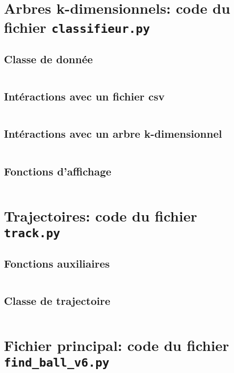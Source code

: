 \documentclass[12pt,a4paper,fleqn]{article}
\begin{document}
\newpage
\section{Arbres k-dimensionnels: code du fichier \texttt{classifieur.py}}

\subsection{Classe de donnée}
\inputminted[firstline=1,lastline=36]{python}{../classifieur.py}
\subsection{Intéractions avec un fichier csv}
\inputminted[firstline=42,lastline=147]{python}{../classifieur.py}
\subsection{Intéractions avec un arbre k-dimensionnel}
\inputminted[firstline=155,lastline=239]{python}{../classifieur.py}
\newpage
\subsection{Fonctions d'affichage}
\inputminted[firstline=246,lastline=307]{python}{../classifieur.py}


\newpage
\section{Trajectoires: code du fichier \texttt{track.py}}

\subsection{Fonctions auxiliaires}
\inputminted[firstline=1,lastline=17]{python}{../track.py}
\subsection{Classe de trajectoire}
\inputminted[firstline=19,lastline=126]{python}{../track.py}


\newpage
\section{Fichier principal: code du fichier \texttt{find_ball_v6.py}}
\end{document}
